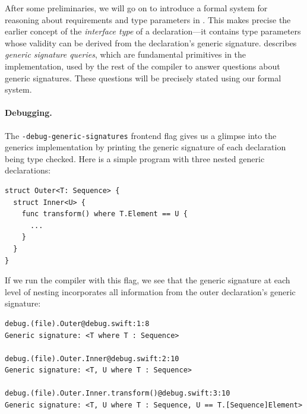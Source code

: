 \documentclass[../generics]{subfiles}
\begin{document}
After some preliminaries, we will go on to introduce a formal system for reasoning about requirements and type parameters in . This makes precise the earlier concept of the \emph{interface type} of a declaration---it contains type parameters whose validity can be derived from the declaration's generic signature.  describes \emph{generic signature queries}, which are fundamental primitives in the implementation, used by the rest of the compiler to answer questions about generic signatures. These questions will be precisely stated using our formal system.

\paragraph{Debugging.} The \texttt{-debug-generic-signatures} frontend flag gives us a glimpse into the generics implementation by printing the generic signature of each declaration being type checked. Here is a simple program with three nested generic declarations:
\begin{Verbatim}
struct Outer<T: Sequence> {
  struct Inner<U> {
    func transform() where T.Element == U {
      ...
    }
  }
}
\end{Verbatim}
If we run the compiler with this flag, we see that the generic signature at each level of nesting incorporates all information from the outer declaration's generic signature:
\begin{Verbatim}
debug.(file).Outer@debug.swift:1:8
Generic signature: <T where T : Sequence>

debug.(file).Outer.Inner@debug.swift:2:10
Generic signature: <T, U where T : Sequence>

debug.(file).Outer.Inner.transform()@debug.swift:3:10
Generic signature: <T, U where T : Sequence, U == T.[Sequence]Element>
\end{Verbatim}
\end{document}
